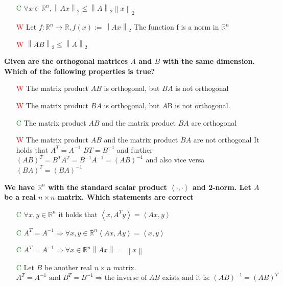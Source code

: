 \documentclass[7pt,landscape, margin = 0.1mm]{article}
\begin{document}
\begin{multicols}{4}
\begin{flushleft}
\begin{itemize}
\item[\textcolor{green}{C}] $\forall x \in \mathbb{R}^n, \left\| Ax\right\|_2\leq \left\| A\right\|_2  \left\| x\right\|_2$
\item[\textcolor{red}{W}] Let $f:\mathbb{R}^{n}\to \mathbb{R}, f(x):=\left\| Ax\right\|_2 $ The function f is a norm in $ \mathbb{R}^{n}$
\item[\textcolor{red}{W}] $\left\| AB\right\|_2\leq \left\| A\right\|_2 $



\end{itemize}
\hspace{3mm}
\textbf{ Given are the orthogonal matrices $A$ and $B$ with the same dimension. Which of the following properties
is true? }
\begin{itemize}
\item[\textcolor{red}{W}] The matrix product $AB$ is orthogonal, but $BA$ is not orthogonal
\item[\textcolor{red}{W}] The matrix product $ BA$ is orthogonal, but $A$B is not orthogonal.
\item[\textcolor{green}{C}] The matrix product $AB$ and the matrix product $BA$ are orthogonal
\item[\textcolor{red}{W}] The matrix product $AB$ and the matrix product $BA$ are not orthogonal
\textcolor{Emerald}{It holds that $A^T = A^{-1}$ $BT = B^{-1}$ and further $(AB)^T = B^TA^T = B^{-1}A^{-1} =
(AB)^{-1}$ and also vice versa $(BA)^T = (BA)^{-1}$}
\end{itemize}

\hspace{3mm}
\textbf{We have $\mathbb{R}^n $ with the standard scalar product $ \left<\cdot ,\cdot \right>$ and 2-norm. Let $A$ be a real $n \times n $ matrix. Which statements are correct}
\begin{itemize}
\item[\textcolor{green}{C}] $\forall x,y \in \mathbb{R}^n$ it holds that $ \left<x,A^Ty \right>=\left<Ax,y \right> $
\item[\textcolor{green}{C}] $A^T=A^{-1} \Rightarrow  \forall x,y \in \mathbb{R}^n \left<Ax,Ay \right>=\left<x,y \right> $
\item[\textcolor{green}{C}] $A^T=A^{-1} \Rightarrow  \forall x\in \mathbb{R}^n \left\|Ax \right\| = \left\| x\right\| $
\item[\textcolor{green}{C}] Let  $B $ be another real $n \times n $ matrix. $A^T=A^{-1} \text{ and }  B^T=B^{-1}\Rightarrow \text{the inverse of } AB \text{ exists and it is: } (AB)^{-1} = (AB)^T$  
 

\end{itemize}
\end{flushleft}
\end{multicols}
\end{document}
